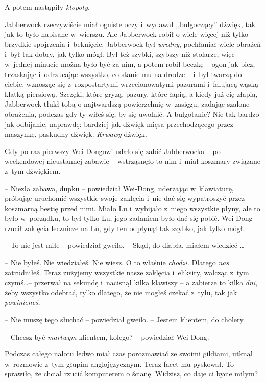 \documentclass[oneside,polish,11pt,rmheadings]{mwbk}
\begin{document}
A potem nastąpiły \textit{kłopoty}.  


Jabberwock rzeczywiście miał ogniste oczy i~wydawał ,,bulgoczący'' dźwięk, tak jak to było napisane w~wierszu. Ale Jabberwock robił o wiele więcej niż tylko brzydkie spojrzenia i~beknięcie. Jabberwock był \textit{wredny}, pochłaniał wiele obrażeń i~był tak dobry, jak tylko mógł. Był też szybki, szybszy niż stolarze, więc w~jednej minucie można było być za nim, a potem robił beczkę -- ogon jak bicz, trzaskając i~odrzucając wszystko, co stanie mu na drodze -- i~był twarzą do ciebie, wznosząc się z~rozpostartymi wrzecionowatymi pazurami i~falującą wąską klatką piersiową. Szczęki, które gryzą, pazury, które łapią, a kiedy już cię złapią, Jabberwock tłukł tobą o najtwardszą powierzchnię w~zasięgu, zadając szalone obrażenia, podczas gdy ty wiłeś się, by się uwolnić. A bulgotanie? Nie tak bardzo jak odbijanie, naprawdę: bardziej jak dźwięk mięsa przechodzącego przez maszynkę, paskudny dźwięk. \textit{Krwawy }dźwięk. 


Gdy po raz pierwszy Wei-Dongowi udało się zabić Jabberwocka -- po weekendowej nieustannej zabawie -- wstrząsnęło to nim i~miał koszmary związane z~tym dźwiękiem. 


-- Niezła zabawa, dupku -- powiedział Wei-Dong, uderzając w~klawiaturę, próbując uruchomić wszystkie swoje zaklęcia i~nie dać się wypatroszyć przez koszmarną bestię przed nimi. Miało Lu i~wybijało z~niego wszystkie płyny, ale to było w~porządku, to był tylko Lu, jego zadaniem było dać się pobić. Wei-Dong rzucił zaklęcia lecznicze na Lu, gdy ten odpłynął tak szybko, jak tylko mógł. 


-- To nie jest miłe -- powiedział gweilo. -- Skąd, do diabła, miałem wiedzieć \ldots  


-- Nie byłeś. Nie wiedziałeś. Nie wiesz. O to właśnie \textit{chodzi.} Dlatego \textit{nas }zatrudniłeś. Teraz zużyjemy wszystkie nasze zaklęcia i~eliksiry, walcząc z~tym czymś\ldots  -- przerwał na sekundę i~nacisnął kilka klawiszy -- a zabierze to kilka \textit{dni}, żeby wszystko odebrać, tylko dlatego, że nie mogłeś czekać z~tyłu, tak jak \textit{powinieneś}. 


-- Nie muszę tego słuchać -- powiedział gweilo. -- Jestem klientem, do cholery.  


-- Chcesz być \textit{martwym }klientem, kolego? -- powiedział Wei-Dong. 

Podczas całego nalotu ledwo miał czas porozmawiać ze swoimi gildiami, utknął w~rozmowie z~tym głupim anglojęzycznym. Teraz facet mu pyskował. To sprawiło, że chciał rzucić komputerem o ścianę. Widzisz, co daje ci bycie miłym? 
\end{document}
